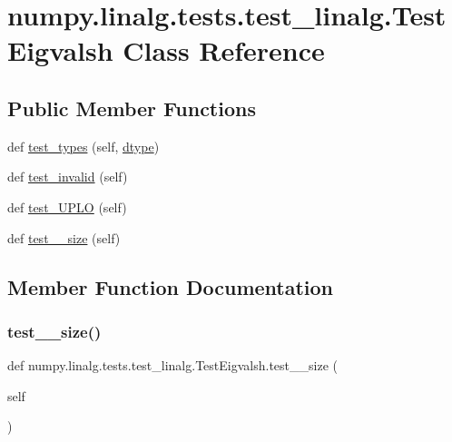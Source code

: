 \hypertarget{classnumpy_1_1linalg_1_1tests_1_1test__linalg_1_1TestEigvalsh}{}\section{numpy.\+linalg.\+tests.\+test\+\_\+linalg.\+Test\+Eigvalsh Class Reference}
\label{classnumpy_1_1linalg_1_1tests_1_1test__linalg_1_1TestEigvalsh}
\subsection*{Public Member Functions}
\begin{DoxyCompactItemize}
\item 
def \hyperlink{classnumpy_1_1linalg_1_1tests_1_1test__linalg_1_1TestEigvalsh_a71f8e7704cbf4c7ad6ab528245c612d8}{test\+\_\+types} (self, \hyperlink{namespacenumpy_1_1linalg_1_1tests_1_1test__linalg_a1063ea74fa35b7244592f8a89b8a71a2}{dtype})
\item 
def \hyperlink{classnumpy_1_1linalg_1_1tests_1_1test__linalg_1_1TestEigvalsh_a3d440d58e386f090b2f9213b07a4885c}{test\+\_\+invalid} (self)
\item 
def \hyperlink{classnumpy_1_1linalg_1_1tests_1_1test__linalg_1_1TestEigvalsh_a8b9940606709c3cb76497aea0b9e9336}{test\+\_\+\+U\+P\+LO} (self)
\item 
def \hyperlink{classnumpy_1_1linalg_1_1tests_1_1test__linalg_1_1TestEigvalsh_ae7b352fad0b2456c34df064b212a1625}{test\+\_\+\_\+size} (self)
\end{DoxyCompactItemize}


\subsection{Member Function Documentation}
\mbox{\label{classnumpy_1_1linalg_1_1tests_1_1test__linalg_1_1TestEigvalsh_ae7b352fad0b2456c34df064b212a1625}} 
\subsubsection{\texorpdfstring{test\+\_\+\_\+size()}{test\_0\_size()}}
{\footnotesize\ttfamily def numpy.\+linalg.\+tests.\+test\+\_\+linalg.\+Test\+Eigvalsh.\+test\+\_\+\_\+size (\begin{DoxyParamCaption}\item[{}]{self }\end{DoxyParamCaption})}

